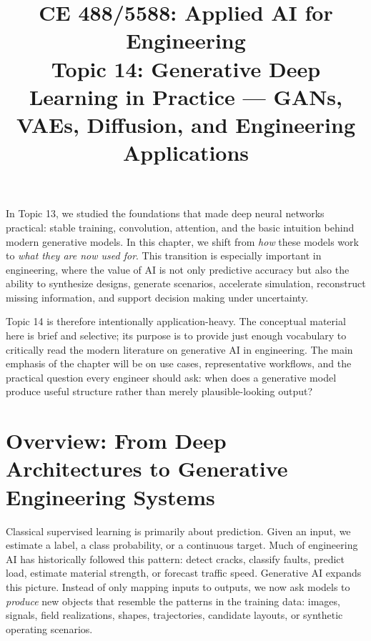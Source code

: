 \documentclass[12pt]{article}
\begin{document}
\doublespacing

\title{CE 488/5588: Applied AI for Engineering\\ \large Topic 14: Generative Deep Learning in Practice --- GANs, VAEs, Diffusion, and Engineering Applications}
\author{}
\date{}
\maketitle

\begin{ch-box}
In Topic 13, we studied the foundations that made deep neural networks practical: stable training, convolution, attention, and the basic intuition behind modern generative models. In this chapter, we shift from \textit{how} these models work to \textit{what they are now used for}. This transition is especially important in engineering, where the value of AI is not only predictive accuracy but also the ability to synthesize designs, generate scenarios, accelerate simulation, reconstruct missing information, and support decision making under uncertainty.

Topic 14 is therefore intentionally application-heavy. The conceptual material here is brief and selective; its purpose is to provide just enough vocabulary to critically read the modern literature on generative AI in engineering. The main emphasis of the chapter will be on use cases, representative workflows, and the practical question every engineer should ask: when does a generative model produce useful structure rather than merely plausible-looking output?
\end{ch-box}

\section{Overview: From Deep Architectures to Generative Engineering Systems}

Classical supervised learning is primarily about prediction. Given an input, we estimate a label, a class probability, or a continuous target. Much of engineering AI has historically followed this pattern: detect cracks, classify faults, predict load, estimate material strength, or forecast traffic speed. Generative AI expands this picture. Instead of only mapping inputs to outputs, we now ask models to \textit{produce} new objects that resemble the patterns in the training data: images, signals, field realizations, shapes, trajectories, candidate layouts, or synthetic operating scenarios.
\end{document}
